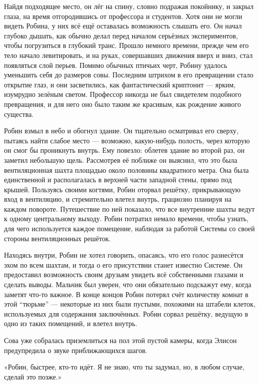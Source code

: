 \documentclass[a5paper, 9pt,
final, openany, twoside=true]{memoir}
\begin{document}
Найдя подходящее место, он лёг на спину, словно подражая покойнику, и закрыл глаза, на время отгородившись от профессора и студентов. Хотя они не могли видеть Робина, у них всё ещё оставалась возможность слышать его. Он начал глубоко дышать, как обычно делал перед началом серьёзных экспериментов, чтобы погрузиться в глубокий транс. Прошло немного времени, прежде чем его тело начало левитировать, и на руках, совершавших движения вверх и вниз, стал появляться слой перьев. Помимо обычных птичьих черт, Робину удалось уменьшить себя до размеров совы. Последним штрихом в его превращении стало открытие глаз, и они засветились, как фантастический криптонит — ярким, изумрудно зелёным светом. Профессор никогда не был свидетелем подобного превращения, и для него оно было таким же красивым, как рождение живого существа.\bigskip

Робин взмыл в небо и обогнул здание. Он тщательно осматривал его сверху, пытаясь найти слабое место — возможно, какую-нибудь полость, через которую он смог бы проникнуть внутрь. Ему повезло: облетев здание во второй раз, он заметил небольшую щель. Рассмотрев её поближе он выяснил, что это была вентиляционная шахта площадью около половины квадратного метра. Она была единственной и располагалась в верхней части западной стены, прямо под крышей. Пользуясь своими когтями, Робин оторвал решётку, прикрывающую вход в вентиляцию, и стремительно влетел внутрь, грациозно планируя на каждом повороте. Путешествие по ней показало, что все внутренние шахты ведут к одному центральному выходу. Робин потратил немало времени, чтобы узнать, для чего используется каждое помещение, наблюдая за работой Системы со своей стороны вентиляционных решёток.

Находясь внутри, Робин не хотел говорить, опасаясь, что его голос разнесётся эхом по всем шахтам, и тогда о его присутствии станет известно Системе. Он предоставил возможность своим друзьям увидеть всё собственными глазами и сделать выводы. Мальчик был уверен, что они обязательно подскажут ему, когда заметят что-то важное. В конце концов Робин потерял счёт количеству комнат в этой ``тюрьме'' — некоторые из них были пустыми, похожими на штабели клеток, используемых для содержания заключённых. Робин сорвал решётку, ведущую в одно из таких помещений, и влетел внутрь.\bigskip

Сова уже собралась приземлиться на пол этой пустой камеры, когда Элисон предупредила о звуке приближающихся шагов.

«Робин, быстрее, кто-то идёт. Я не знаю, что ты задумал, но, в любом случае, сделай это позже.»
\end{document}
